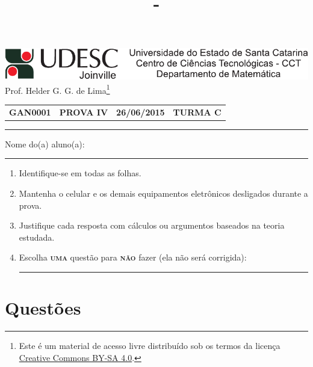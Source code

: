 \documentclass[12pt,a4paper]{article}
\author{\eu}
\title{\tipo - \disciplina}
\date{\data}
\newcommand*\tipo{PROVA IV}
\newcommand*\turma{TURMA C}
\newcommand*\disciplina{GAN0001}
\newcommand*\eu{Helder G. G. de Lima}
\newcommand*\data{26/06/2015}
\begin{document}
\thispagestyle{empty}
\begin{center}
\includegraphics{udesc_joinville_cabecalho.pdf}
\\ Prof. \eu\footnote{
Este é um material de acesso livre distribuído sob os termos da licença \href{https://creativecommons.org/licenses/by-sa/4.0/deed.pt_BR}{Creative Commons BY-SA 4.0}.}

\noindent\begin{tabular}{l c c r}
  \textbf{\disciplina}
& \textbf{\tipo}
& \textbf{\data}
& \textbf{\turma}
\end{tabular}\vspace{-0.3cm}
\noindent\rule{17cm}{0.01cm}
\end{center}

\noindent Nome do(a) aluno(a): \rule{13cm}{0.01cm}

{\footnotesize
\begin{enumerate}
\renewcommand{\theenumi}{\Roman{enumi}}
\item Identifique-se em todas as folhas.
\item Mantenha o celular e os demais equipamentos eletrônicos desligados durante a prova.
\item Justifique cada resposta com cálculos ou argumentos baseados na teoria estudada.
\item Escolha \textsc{\textbf{uma}} questão para \textsc{\textbf{não}} fazer (ela não será corrigida): \rule{3cm}{0.01cm}
\end{enumerate}
}
\section*{Questões}
\end{document}
